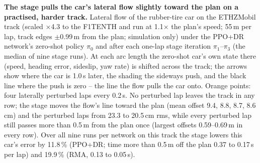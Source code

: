 \caption{\textbf{The stage pulls the car's lateral flow slightly toward the plan on a practised, harder track.} Lateral flow of the
rubber-tire car on the ETHZMobil track (scaled $\times$4.3 to the F1TENTH and run at 1.1$\times$ the plan's speed; 55\,m per lap, track
edges $\pm$0.99\,m from the plan; simulation only) under the PPO+DR network's zero-shot policy $\pi_0$ and after each one-lap stage
iteration $\pi_1$--$\pi_3$ (the median of nine stage runs). At each arc length the zero-shot car's own state there (speed, heading error,
sideslip, yaw rate) is shifted across the track; the arrows show where the car is 1.0\,s later, the shading the sideways push, and the
black line where the push is zero -- the line the flow pulls the car onto. Orange points: four laterally perturbed laps every 0.2\,s. No
perturbed lap leaves the track in any row; the stage moves the flow's line toward the plan (mean offset 9.4, 8.8, 8.7, 8.6\,cm) and the
perturbed laps from 23.3 to 20.5\,cm rms, while every perturbed lap still passes more than 0.5\,m from the plan once (largest offsets
0.59--0.69\,m in every row). Over all nine runs per network on this track the stage lowers this car's error by 11.8\,\% (PPO+DR; time more
than 0.5\,m off the plan 0.37 to 0.17\,s per lap) and 19.9\,\% (RMA, 0.13 to 0.05\,s).}
